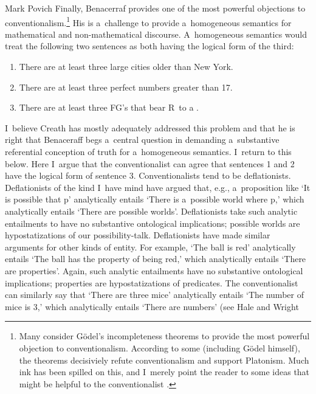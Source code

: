 \begin{artengenv}{Mark Povich}
Finally, Benacerraf
\parencite*[][]{benacerraf_mathematical_1973} %
 provides one of the most powerful objections to conventionalism.\footnote{Many consider Gödel's incompleteness theorems to provide the most powerful objection to conventionalism. According to some (including Gödel himself), the theorems decisiviely refute conventionalism and support Platonism. Much ink has been spilled on this, and I~merely point the reader to some ideas that might be helpful to the conventionalist 
\parencites[][]{moore_more_1999}[][]{floyd_note_2000}[][]{stalnaker_considering_2001}[][]{awodey_how_2004}[][]{berto_goparadox_2009}[][]{lampert_wittgenstein_2018}[][]{warren_shadows_2020}. %
 } His is a~challenge to provide a~homogeneous semantics for mathematical and non-mathematical discourse. A~homogeneous semantics would treat the following two sentences as both having the logical form of the third:
\begin{enumerate}
\item There are at least three large cities older than New York.
\item There are at least three perfect numbers greater than 17.
\item There are at least three FG's that bear R~to a
\parencite[][p.663]{benacerraf_mathematical_1973}.%
\end{enumerate}
I~believe Creath
\parencite*[][]{creath_benacerraf_1980} %
 has mostly adequately addressed this problem and that he is right that Benaceraff begs a~central question in demanding a~substantive referential conception of truth for a~homogeneous semantics. I~return to this below. Here I~argue that the conventionalist can agree that sentences 1 and 2 have the logical form of sentence 3. Conventionalists tend to be deflationists. Deflationists of the kind I~have mind 
\parencites[][]{carnap_empiricism_1950}[][]{Schiffer2003}[][]{thomasson_ontology_2014}[see also][]{price_naturalism_2011} %
 have argued that, e.g., a~proposition like ‘It is possible that p' analytically entails ‘There is a~possible world where p,' which analytically entails ‘There are possible worlds'. Deflationists take such analytic entailments to have no substantive ontological implications; possible worlds are hypostatizations of our possibility-talk. Deflationists have made similar arguments for other kinds of entity. For example, ‘The ball is red' analytically entails ‘The ball has the property of being red,' which analytically entails ‘There are properties'. Again, such analytic entailments have no substantive ontological implications; properties are hypostatizations of predicates. The conventionalist can similarly say that ‘There are three mice' analytically entails ‘The number of mice is 3,' which analytically entails ‘There are numbers' (see Hale and Wright 

\end{artengenv}
